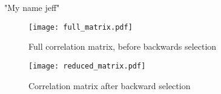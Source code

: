 \begin{table}
    \begin{adjustbox}{width=\textwidth}
    
    \end{adjustbox}
    \caption{"My name jeff"}
    \label{linreg_no_static_table}
\end{table}

\begin{figure}
    \texttt{[image: full\_matrix.pdf]}
    \caption{Full correlation matrix, before backwards selection}
    \label{corr_matrix_full}
\end{figure}

\begin{figure}
    \texttt{[image: reduced\_matrix.pdf]}
    \caption{Correlation matrix after backward selection}
    \label{corr_matrix_reduced}
\end{figure}

